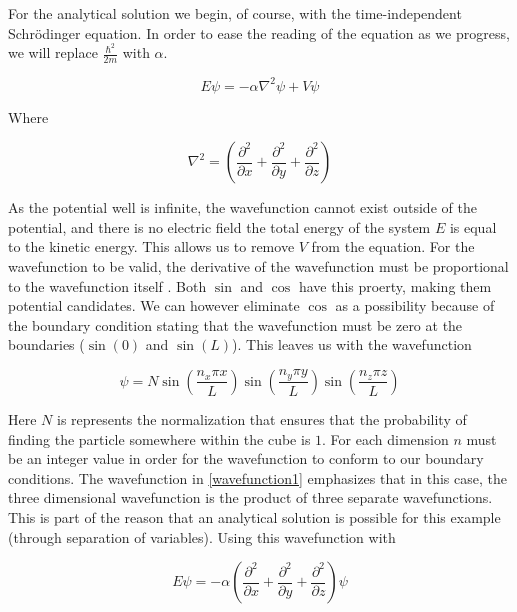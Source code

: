 \documentclass[authoryearcitations]{UoYCSproject}
\begin{document}
For the analytical solution we begin, of course, with the time-independent Schr\"{o}dinger equation. 
In order to ease the reading
of the equation as we progress, we will replace $\frac{\hbar ^2}{2m}$ with $\alpha$.

\begin{equation}
E\psi = -\alpha\nabla ^2 \psi + V\psi 
\label{eq:timeIndependent2}
\end{equation}

Where

\begin{equation}
\nabla ^2 =  \left(\frac{\partial ^2}{\partial x} + \frac{\partial ^2}{\partial y} + \frac{\partial ^2}{\partial z}\right)
\label{eq:laplace}
\end{equation}

As the potential well is infinite, the wavefunction cannot exist outside of the potential, and there is no
electric field the total energy of the system $E$ is equal to the kinetic energy. This allows us to 
remove $V$ from the equation. For the wavefunction to be valid, the derivative of the wavefunction must 
be proportional to the wavefunction itself \cite{PIAB}. Both $\sin$ and $\cos$ have this proerty, making them
potential candidates. We can however eliminate $\cos$ as a possibility 
because of the boundary condition stating that the wavefunction must be zero at the boundaries ($\sin (0)$ and $\sin (L)$). 
This leaves us with the wavefunction

\begin{equation}
\psi = N  \sin (\frac{n_x\pi x}{L}) \sin (\frac{n_y\pi y}{L}) \sin (\frac{n_z\pi z}{L})
\label{wavefunction1}
\end{equation} 

Here $N$ is represents the normalization that ensures that the probability of finding the particle somewhere within the
cube is $1$. For each dimension $n$ must be an integer value in order for the wavefunction to conform to our boundary conditions. 
The wavefunction in \ref{wavefunction1} emphasizes that in this case, the three dimensional wavefunction is the product of 
three separate wavefunctions. This is part of the reason that an analytical solution is possible for this example (through
separation of variables). Using this wavefunction with

\begin{equation}
E\psi =-\alpha \left(\frac{\partial ^2}{\partial x} + \frac{\partial ^2}{\partial y} + \frac{\partial ^2}{\partial z}\right) \psi 
\label{eq:timeIndependent3}
\end{equation}
\end{document}
